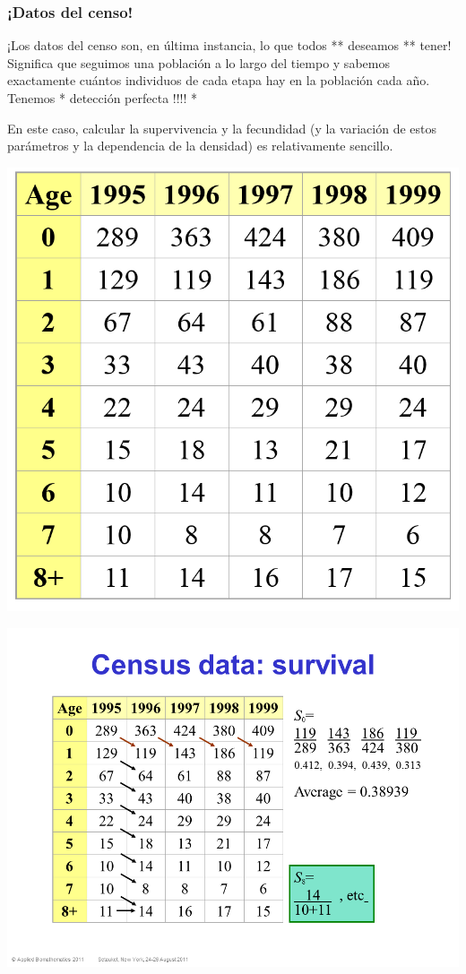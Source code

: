 \documentclass[
]{article}
\begin{document}
\hypertarget{datos-del-censo}{%
\subsubsection{¡Datos del censo!}\label{datos-del-censo}}

¡Los datos del censo son, en última instancia, lo que todos ** deseamos
** tener! Significa que seguimos una población a lo largo del tiempo y
sabemos exactamente cuántos individuos de cada etapa hay en la población
cada año. Tenemos * detección perfecta !!!! *

En este caso, calcular la supervivencia y la fecundidad (y la variación
de estos parámetros y la dependencia de la densidad) es relativamente
sencillo.

\includegraphics{figures/census1.png}

\includegraphics{figures/census2.png}
\end{document}
